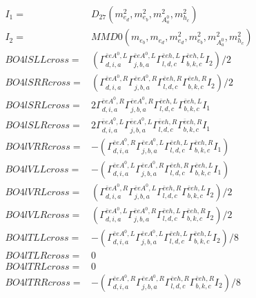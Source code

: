 \documentclass[A4,landscape]{article}
\begin{document}
\begin{align} 
I_1 = & D_{27}(m^2_{e_{{d}}}, m^2_{e_{{b}}}, m^2_{A^0_{{a}}}, m^2_{h_{{c}}}) \\ 
I_2 = & MMD0(m_{e_{{b}}}, m_{e_{{d}}}, m^2_{e_{{d}}}, m^2_{e_{{b}}}, m^2_{A^0_{{a}}}, m^2_{h_{{c}}}) \\ 
  BO4lSLLcross= & ( \Gamma^{\bar{e}e A^0 ,L}_{d, i, a} \Gamma^{\bar{e}e A^0 ,L}_{j, b, a} \Gamma^{\bar{e}e h ,L}_{l, d, c} \Gamma^{\bar{e}e h ,L}_{b, k, c} I_2)/2 \\ 
  BO4lSRRcross= & ( \Gamma^{\bar{e}e A^0 ,R}_{d, i, a} \Gamma^{\bar{e}e A^0 ,R}_{j, b, a} \Gamma^{\bar{e}e h ,R}_{l, d, c} \Gamma^{\bar{e}e h ,R}_{b, k, c} I_2)/2 \\ 
  BO4lSRLcross= & 2  \Gamma^{\bar{e}e A^0 ,R}_{d, i, a} \Gamma^{\bar{e}e A^0 ,R}_{j, b, a} \Gamma^{\bar{e}e h ,L}_{l, d, c} \Gamma^{\bar{e}e h ,L}_{b, k, c} I_1 \\ 
  BO4lSLRcross= & 2  \Gamma^{\bar{e}e A^0 ,L}_{d, i, a} \Gamma^{\bar{e}e A^0 ,L}_{j, b, a} \Gamma^{\bar{e}e h ,R}_{l, d, c} \Gamma^{\bar{e}e h ,R}_{b, k, c} I_1 \\ 
  BO4lVRRcross= & -( \Gamma^{\bar{e}e A^0 ,R}_{d, i, a} \Gamma^{\bar{e}e A^0 ,L}_{j, b, a} \Gamma^{\bar{e}e h ,L}_{l, d, c} \Gamma^{\bar{e}e h ,R}_{b, k, c} I_1) \\ 
  BO4lVLLcross= & -( \Gamma^{\bar{e}e A^0 ,L}_{d, i, a} \Gamma^{\bar{e}e A^0 ,R}_{j, b, a} \Gamma^{\bar{e}e h ,R}_{l, d, c} \Gamma^{\bar{e}e h ,L}_{b, k, c} I_1) \\ 
  BO4lVRLcross= & ( \Gamma^{\bar{e}e A^0 ,R}_{d, i, a} \Gamma^{\bar{e}e A^0 ,L}_{j, b, a} \Gamma^{\bar{e}e h ,R}_{l, d, c} \Gamma^{\bar{e}e h ,L}_{b, k, c} I_2)/2 \\ 
  BO4lVLRcross= & ( \Gamma^{\bar{e}e A^0 ,L}_{d, i, a} \Gamma^{\bar{e}e A^0 ,R}_{j, b, a} \Gamma^{\bar{e}e h ,L}_{l, d, c} \Gamma^{\bar{e}e h ,R}_{b, k, c} I_2)/2 \\ 
  BO4lTLLcross= & -( \Gamma^{\bar{e}e A^0 ,L}_{d, i, a} \Gamma^{\bar{e}e A^0 ,L}_{j, b, a} \Gamma^{\bar{e}e h ,L}_{l, d, c} \Gamma^{\bar{e}e h ,L}_{b, k, c} I_2)/8 \\ 
  BO4lTLRcross= & 0 \\ 
  BO4lTRLcross= & 0 \\ 
  BO4lTRRcross= & -( \Gamma^{\bar{e}e A^0 ,R}_{d, i, a} \Gamma^{\bar{e}e A^0 ,R}_{j, b, a} \Gamma^{\bar{e}e h ,R}_{l, d, c} \Gamma^{\bar{e}e h ,R}_{b, k, c} I_2)/8 \\ 
\end{align} 
\end{document}
